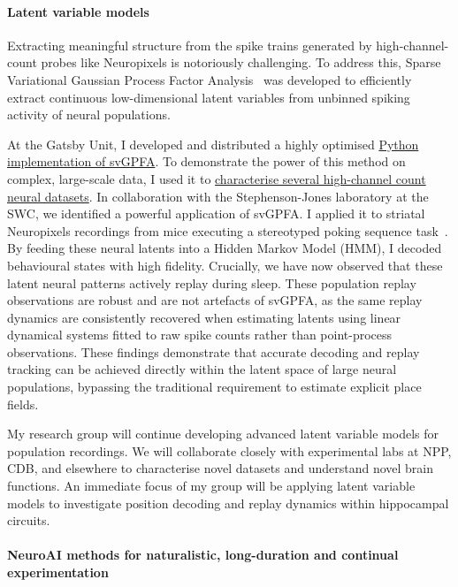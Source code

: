 \documentclass{article}
\begin{document}
\paragraph{Latent variable models}

Extracting meaningful structure from the spike trains generated by
high-channel-count probes like Neuropixels is notoriously challenging. To
address this, Sparse Variational Gaussian Process Factor
Analysis~\citep[svGPFA;][]{dunckerAndSahani18} was developed to efficiently
extract continuous low-dimensional latent variables from unbinned spiking
activity of neural populations.

At the Gatsby Unit, I developed and distributed a highly optimised
\href{https://github.com/joacorapela/svGPFA}{Python implementation of svGPFA}.
To demonstrate the power of this method on complex, large-scale data, I used it
to \href{https://joacorapela/svGPFA/auto_examples/index.html}{characterise
several high-channel count neural datasets}.
%
In collaboration with the Stephenson-Jones laboratory at the SWC, we identified
a powerful application of svGPFA. I applied it to striatal Neuropixels
recordings from mice executing a stereotyped poking sequence
task~\citep{thompsonEtAl24}. By feeding these neural latents into a Hidden
Markov Model (HMM), I decoded behavioural states with high fidelity.
Crucially, we have now observed that these latent neural patterns actively
replay during sleep. These population replay observations are robust and are
not artefacts of svGPFA, as the same replay dynamics are consistently recovered
when estimating latents using linear dynamical systems fitted to raw spike
counts rather than point-process observations.
%
These findings demonstrate that accurate decoding and replay tracking can be
achieved directly within the latent space of large neural populations,
bypassing the traditional requirement to estimate explicit place fields.

My research group will continue developing advanced latent variable
models for population recordings. We will collaborate closely with experimental
labs at NPP, CDB, and elsewhere to characterise novel datasets and understand
novel brain functions. An immediate focus of my group will be applying
latent variable models to investigate position decoding and replay dynamics
within hippocampal circuits.

\paragraph{NeuroAI methods for naturalistic, long-duration and continual
experimentation}
\end{document}
